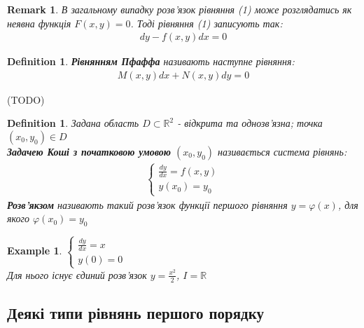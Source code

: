 \documentclass[a4paper, 10pt]{article}
\theoremstyle{theoremdd}
\theoremstyle{theoremdd}
\newtheorem{definition}[theorem]{Definition}
\theoremstyle{theoremdd}
\theoremstyle{theoremdd}
\newtheorem{example}[theorem]{Example}
\theoremstyle{theoremdd}
\theoremstyle{theoremdd}
\newtheorem{remark}[theorem]{Remark}
\theoremstyle{theoremdd}
\theoremstyle{theoremdd}
\begin{document}
	\begin{remark}
 В загальному випадку розв'язок рівняння (1) може розглядатись як неявна функція $F(x,y)=0$. Тоді рівняння (1) записують так:
	\begin{align*}
	dy - f(x,y)dx=0
	\end{align*}
	\end{remark}
	
	\begin{definition}
 \textbf{Рівнянням Пфаффа} називають наступне рівняння:
	\begin{align}
	M(x,y)dx + N(x,y)dy=0
	\end{align}
	\end{definition}

	(TODO)
	\bigskip \\
	\begin{definition}
 Задана область $D \subset \mathbb{R}^2$ - відкрита та однозв'язна; точка $(x_0, y_0) \in D$\\
	\textbf{Задачею Коші з початковою умовою} $(x_0,y_0)$ називається система рівнянь:
	\begin{align*}
	\begin{cases}
	\displaystyle \frac{dy}{dx}=f(x,y)\\
	y(x_0)=y_0
	\end{cases}
	\end{align*}
	\textbf{Розв'якзом} називають такий розв'язок функції першого рівняння $y=\varphi(x)$, для якого $\varphi(x_0)=y_0$
	\end{definition}
	
	\begin{example}
	$
	\begin{cases}
	\displaystyle \frac{dy}{dx}=x\\
	y(0)=0
	\end{cases}
	$\\
	Для нього існує єдиний розв'язок $\displaystyle y = \frac{x^2}{2}$, $I=\mathbb{R}$
	\end{example}
	
	\subsection{Деякі типи рівнянь першого порядку}
\end{document}

